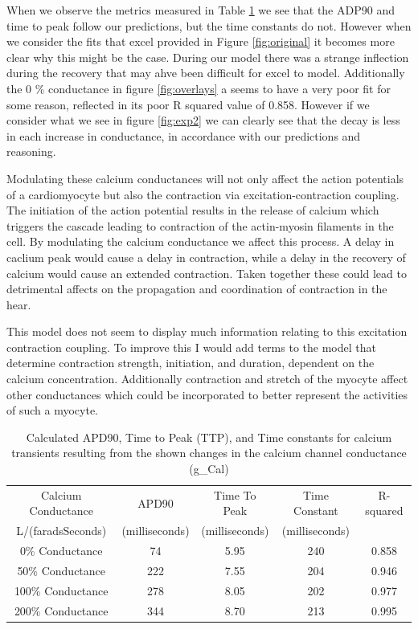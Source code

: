 \documentclass[11pt]{article}
\begin{document}
\par{}
When we observe the metrics measured in Table \ref{tab:calcium} we see that the ADP90 and time to peak follow our predictions, but the time constants do not. However when we consider the fits that excel provided in Figure \ref{fig:original} it becomes more clear why this might be the case. During our model there was a strange inflection during the recovery that may ahve been difficult for excel to model. Additionally the 0 \% conductance in figure \ref{fig:overlays} a seems to have a very poor fit for some reason, reflected in its poor R squared value of 0.858. However if we consider what we see in figure \ref{fig:exp2} we can clearly see that the decay is less in each increase in conductance, in accordance with our predictions and reasoning.
\par{}
Modulating these calcium conductances will not only affect the action potentials of a cardiomyocyte but also the contraction via excitation-contraction coupling. The initiation of the action potential results in the release of calcium which triggers the cascade leading to contraction of the actin-myosin filaments in the cell. By modulating the calcium conductance we affect this process. A delay in caclium peak would cause a delay in contraction, while a delay in the recovery of calcium would cause an extended contraction. Taken together these could lead to detrimental affects on the propagation and coordination of contraction in the hear.
\par{}
This model does not seem to display much information relating to this excitation contraction coupling. To improve this I would add terms to the model that determine contraction strength, initiation, and duration, dependent on the calcium concentration. Additionally contraction and stretch of the myocyte affect other conductances which could be incorporated to better represent the activities of such a myocyte.


\begin{table}[H]
	\centering
	\caption{Calculated APD90, Time to Peak (TTP), and Time constants for calcium transients resulting from the shown changes in the calcium channel conductance (g\_Cal)}
	\label{tab:calcium}
	\begin{tabular}{ccccc}
		\hline \hline
		Calcium Conductance & APD90  & Time To Peak  & Time Constant & R-squared\\ 
		L/(faradsSeconds) & (milliseconds) & (milliseconds)& (milliseconds)& \\
		\hline
		0\% Conductance & 74& 5.95&240 &0.858 \\ 
		50\% Conductance &222 &7.55 &204 &0.946 \\ 
		
		100\% Conductance & 278 &8.05 & 202& 0.977\\ 
		
		200\% Conductance& 344 & 8.70& 213& 0.995\\ 
		
		
		\hline 
		\hline
	\end{tabular} 
\end{table}
\end{document}
